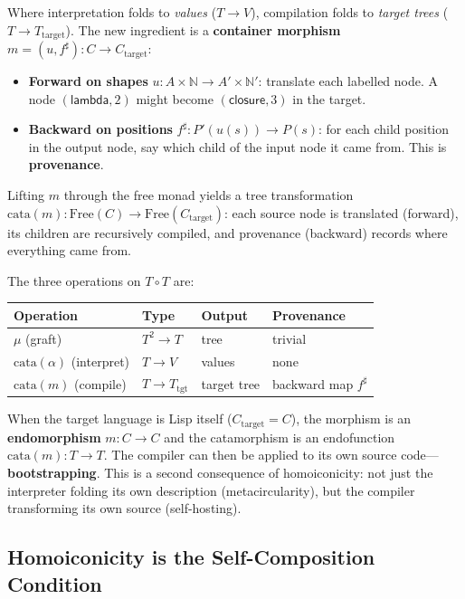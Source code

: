 \documentclass[11pt,a4paper]{article}
\theoremstyle{definition}
\theoremstyle{plain}
\newcommand{\Free}{\mathrm{Free}}
\begin{document}
Where interpretation folds to \emph{values} ($T \to V$), compilation
folds to \emph{target trees} ($T \to T_{\mathrm{target}}$). The new
ingredient is a \textbf{container morphism}
$m = (u, f^\sharp) : C \to C_{\mathrm{target}}$:
\begin{itemize}[nosep]
\item \textbf{Forward on shapes} $u : A \times \mathbb{N} \to
  A' \times \mathbb{N}'$: translate each labelled node. A node
  $(\mathsf{lambda}, 2)$ might become $(\mathsf{closure}, 3)$ in
  the target.
\item \textbf{Backward on positions} $f^\sharp : P'(u(s)) \to P(s)$:
  for each child position in the output node, say which child of the
  input node it came from. This is \textbf{provenance}.
\end{itemize}
Lifting $m$ through the free monad yields a tree transformation
$\mathrm{cata}(m) : \Free(C) \to \Free(C_{\mathrm{target}})$: each
source node is translated (forward), its children are recursively
compiled, and provenance (backward) records where everything came from.

The three operations on $T \circ T$ are:
\begin{center}
\renewcommand{\arraystretch}{1.3}
\begin{tabular}{@{}llll@{}}
\hline
Operation & Type & Output & Provenance \\
\hline
$\mu$ (graft) & $T^2 \to T$ & tree & trivial \\
$\mathrm{cata}(\alpha)$ (interpret) & $T \to V$ & values & none \\
$\mathrm{cata}(m)$ (compile) & $T \to T_{\mathrm{tgt}}$ &
  target tree & backward map $f^\sharp$ \\
\hline
\end{tabular}
\end{center}

When the target language is Lisp itself ($C_{\mathrm{target}} = C$),
the morphism is an \textbf{endomorphism} $m : C \to C$ and the
catamorphism is an endofunction $\mathrm{cata}(m) : T \to T$. The
compiler can then be applied to its own source code---\textbf{%
bootstrapping}. This is a second consequence of homoiconicity: not
just the interpreter folding its own description (metacircularity),
but the compiler transforming its own source (self-hosting).

\subsection{Homoiconicity is the Self-Composition Condition}
\end{document}
